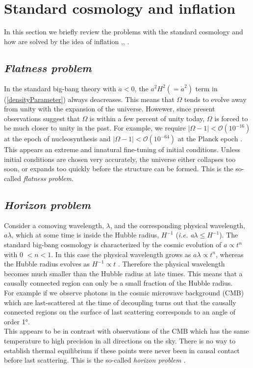 \documentclass[11pt,a4paper,twoside]{book}
\begin{document}
\section{Standard cosmology and inflation}
In this section we briefly review the problems with the standard cosmology and how are solved by the idea of inflation \cite{Liddle:intro},\cite{Dodelson:Chap1}, \cite{InflationDynamicsAndReheating:chap1}. 

\subsection*{\emph{Flatness problem}}
In the standard big-bang theory with $ \ddot{a} < 0  $, the $ a^{2}H^{2} (= \dot{a}^{2}) $ term in (\ref{densityParameter}) always deacreases. This means that
$ \Omega $ tends to evolve away from unity with the expansion of the universe. Howewer, since present observations suggest that $ \Omega  $ is within a few percent of unity today, $ \Omega $ is forced to be much closer to unity in the past. For example, we require $ |\Omega-1| < \mathcal{O}(10^{-16}) $ at the epoch of nucleosynthesis and  $ |\Omega-1| < \mathcal{O}(10^{-64}) $ at the Planck epoch \cite{Liddle:intro}. This appears an extreme and innatural fine-tuning of initial conditions. Unless initial conditions are chosen  very accurately, the universe either collapses too soon, or expands too quickly before the structure can be formed. This is the so-called \textit{flatness problem}.

\subsection*{\emph{Horizon problem}}
Consider a comoving wavelength, $ \lambda $, and the corresponding physical wavelength, $ a\lambda $, which at some time is inside the Hubble radius, $ H^{-1} $ (\emph{i.e. a$ \lambda \leq  H^{-1}  $}). The standard big-bang cosmology is characterized by the cosmic evolution of  $a \propto t^{n} $ with 0 $< n < 1$. In this case the physical wavelength grows as $ a\lambda \propto t^{n} $, whereas the Hubble radius evolves as $H^{-1}\propto t$ . Therefore the physical wavelength becomes much smaller than the Hubble radius at late times.
This means that a causally connected region can only be a small fraction of the Hubble radius.\\
For example if we observe photons in the cosmic microwave background (CMB) which are last-scattered at the time of decoupling turns out that the causally connected regions on the surface of last scattering corresponds to an angle of order 1°.\\
This appears to be in contrast with observations of the CMB which has the same temperature to high precision in all directions on the sky. There is no way to establish thermal equilibrium if these points were never been in causal contact before last scattering. This is the so-called \textit{horizon problem} .
\end{document}
